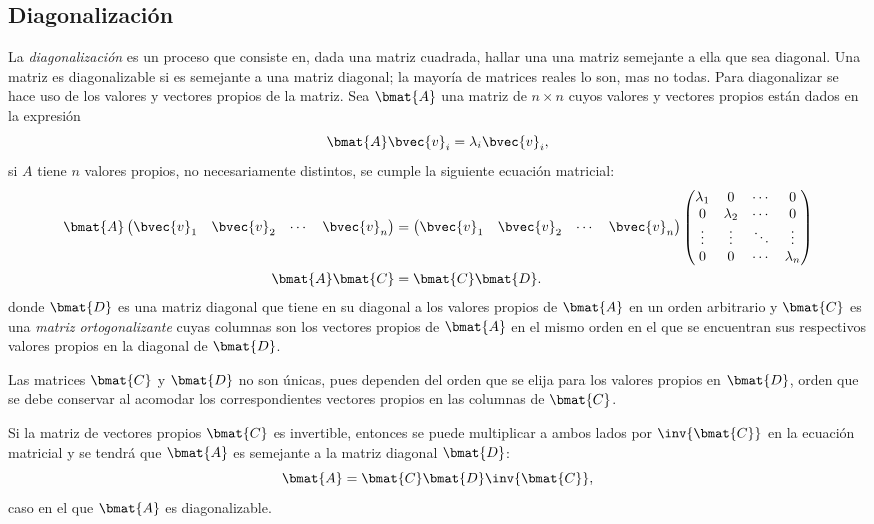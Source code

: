 \documentclass{fmbnotes}
\begin{document}
\subsection{Diagonalización}

La \emph{diagonalización} es un proceso que consiste en, dada una matriz cuadrada, hallar una una matriz semejante a ella que sea diagonal. Una matriz es diagonalizable si es semejante a una matriz diagonal; la mayoría de matrices reales lo son, mas no todas. Para diagonalizar se hace uso de los valores y vectores propios de la matriz. Sea \(\bmat{A}\) una matriz de \(n\times n\) cuyos valores y vectores propios están dados en la expresión 
\[\bmat{A}\bvec{v}_i=\lambda_i\bvec{v}_i,\]
si \(A\) tiene \(n\) valores propios, no necesariamente distintos, se cumple la siguiente ecuación matricial:
\begin{align*}
	\bmat{A}\begin{pmatrix}
	\bvec{v}_1&\bvec{v}_2&\cdots&\bvec{v}_n
	\end{pmatrix} & =\begin{pmatrix}
	\bvec{v}_1&\bvec{v}_2&\cdots&\bvec{v}_n
	\end{pmatrix} \begin{pmatrix}
	\lambda_1 & 0 & \cdots & 0 \\ 0 & \lambda_2 & \cdots & 0 \\ \vdots & \vdots & \ddots & \vdots \\ 0 & 0 & \cdots & \lambda_n
	\end{pmatrix} \\
	\bmat{A}\bmat{C}&=\bmat{C}\bmat{D}.
\end{align*}
donde \(\bmat{D}\) es una matriz diagonal que tiene en su diagonal a los valores propios de \(\bmat{A}\) en un orden arbitrario y \(\bmat{C}\) es una \emph{matriz ortogonalizante} cuyas columnas son los vectores propios de \(\bmat{A}\) en el mismo orden en el que se encuentran sus respectivos valores propios en la diagonal de \(\bmat{D}\). 

\begin{tip}
	Las matrices \(\bmat{C}\) y \(\bmat{D}\) no son únicas, pues dependen del orden que se elija para los valores propios en \(\bmat{D}\), orden que se debe conservar al acomodar los correspondientes vectores propios en las columnas de \(\bmat{C}\). 
\end{tip}

Si la matriz de vectores propios \(\bmat{C}\) es invertible, entonces se puede multiplicar a ambos lados por \(\inv{\bmat{C}}\) en la ecuación matricial y se tendrá que \(\bmat{A}\) es semejante a la matriz diagonal \(\bmat{D}\): 
\[\bmat{A}=\bmat{C}\bmat{D}\inv{\bmat{C}},\]
caso en el que \(\bmat{A}\) es diagonalizable. 
\end{document}
